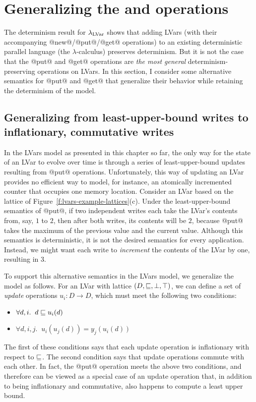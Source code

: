 \section{Generalizing the  and  operations}\label{s:lvars-generalizing}

The determinism result for $\lambda_{\textrm{LVar}}$ shows that adding LVars (with
their accompanying @new@/@put@/@get@ operations) to an existing
deterministic parallel language (the $\lambda$-calculus) preserves
determinism.  But it is not the case that the @put@ and @get@
operations are \emph{the most general} determinism-preserving
operations on LVars.  In this section, I consider some alternative
semantics for @put@ and @get@ that generalize their behavior while
retaining the determinism of the model.

\subsection{Generalizing from least-upper-bound writes to inflationary, commutative writes}\label{subsection:lvars-generalizing-from-least-upper-bound-writes}

In the LVars model as presented in this chapter so far, the only way
for the state of an LVar to evolve over time is through a series of
least-upper-bound updates resulting from @put@ operations.
Unfortunately, this way of updating an LVar provides no efficient way
to model, for instance, an atomically incremented counter that
occupies one memory location.  Consider an LVar based on the lattice
of Figure~\ref{f:lvars-example-lattices}(c).  Under the
least-upper-bound semantics of @put@, if two independent writes each
take the LVar's contents from, say, $1$ to $2$, then after both
writes, its contents will be $2$, because @put@ takes the maximum of
the previous value and the current value.  Although this semantics is
deterministic, it is not the desired semantics for every application.
Instead, we might want each write to \emph{increment} the contents of
the LVar by one, resulting in $3$.


To support this alternative semantics in the LVars model, we
generalize the model as follows.  For an LVar with lattice $(D,
\sqsubseteq, \bot, \top)$, we can define a set of \emph{update}
operations $u_i : D \rightarrow D$, which must meet the following two
conditions:
\begin{itemize}
\item $\forall d, i.     \;\; d \sqsubseteq u_i(d) $
\item $\forall d, i, j.  \;\; u_i(u_j(d)) = y_j(u_i(d)) $
\end{itemize}
The first of these conditions says that each update operation is
inflationary with respect to $\sqsubseteq$.  The second condition says
that update operations commute with each other.  In fact, the @put@
operation meets the above two conditions, and therefore can be viewed
as a special case of an update operation that, in addition to being
inflationary and commutative, also happens to compute a least upper
bound.

